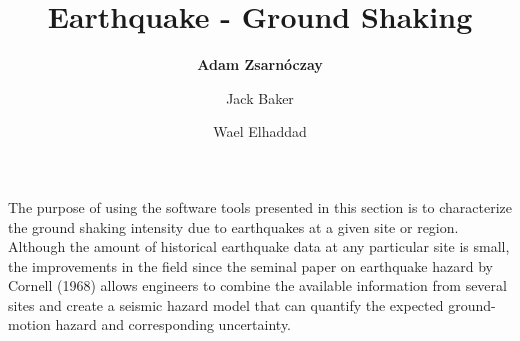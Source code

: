%
%
%


%
%
%
%
%
%
%
%

\title{Earthquake - Ground Shaking}
\author{
    \textbf{Adam Zsarnóczay} 
    \and Jack Baker 
    \and Wael Elhaddad}
\tocauthor{}
%
%
\maketitle

The purpose of using the software tools presented in this section is to characterize the ground shaking intensity due to earthquakes at a given site or region. Although the amount of historical earthquake data at any particular site is small, the improvements in the field since the seminal paper on earthquake hazard by Cornell (1968) allows engineers to combine the available information from several sites and create a seismic hazard model that can quantify the expected ground-motion hazard and corresponding uncertainty. 

